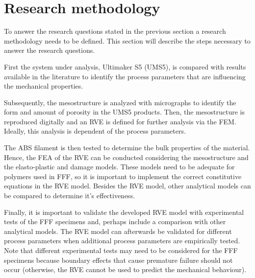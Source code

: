 
\section{Research methodology}
To answer the research questions stated in the previous section a research methodology needs to be defined. This section will describe the steps necessary to answer the research questions. 

First the system under analysis, Ultimaker S5 (UMS5), is compared with results available in the literature to identify the process parameters that are influencing the mechanical properties. 

Subsequently, the mesostructure is analyzed with micrographs to identify the form and amount of porosity in the UMS5 products. Then, the mesostructure is reproduced digitally and an RVE is defined for further analysis via the FEM. Ideally, this analysis is dependent of the process parameters. 

The ABS filament is then tested to determine the bulk properties of the material. Hence, the FEA of the RVE can be conducted considering the mesostructure and the elasto-plastic and damage models. These models need to be adequate for polymers used in FFF, so it is important to implement the correct constitutive equations in the RVE model. Besides the RVE model, other analytical models can be compared to determine it's effectiveness.  

Finally, it is important to validate the developed RVE model with experimental tests of the FFF specimens and, perhaps include a comparison with other analytical models. The RVE model can afterwards be validated for different process parameters when additional process parameters are empirically tested. Note that different experimental tests may need to be considered for the FFF specimens because boundary effects that cause premature failure should not occur (otherwise, the RVE cannot be used to predict the mechanical behaviour).



